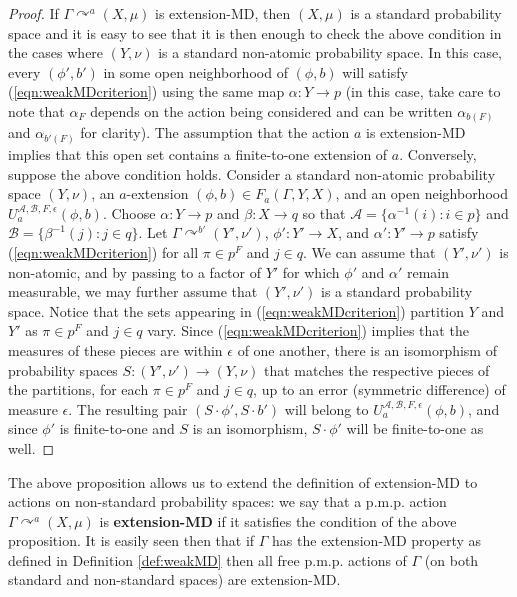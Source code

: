 \documentclass[12pt]{amsart}
\theoremstyle{definition}
\def\cal{\mathcal}
\newcommand{\pmp}{p{$.$}m{$.$}p{$.$}}
\newcommand{\acts}{\curvearrowright}
\begin{document}
\begin{proof}
    If $\Gamma \acts^a (X, \mu)$ is extension-MD, then $(X, \mu)$ is a standard probability space and it is easy to see that it is then enough to check the above condition in the cases where $(Y, \nu)$ is a standard non-atomic probability space. In this case, every $(\phi', b')$ in some open neighborhood of $(\phi, b)$ will satisfy (\ref{eqn:weakMDcriterion}) using the same map $\alpha : Y \to p$ (in this case, take care to note that $\alpha_F$ depends on the action being considered and can be written $\alpha_{b(F)}$ and $\alpha_{b'(F)}$ for clarity). The assumption that the action $a$ is extension-MD implies that this open set contains a finite-to-one extension of $a$. Conversely, suppose the above condition holds. Consider a standard non-atomic probability space $(Y, \nu)$, an $a$-extension $(\phi, b) \in F_a(\Gamma, Y, X)$, and an open neighborhood $U^{\cal A, \cal B, F, \epsilon}_a(\phi, b)$. Choose $\alpha : Y \to p$ and $\beta : X \to q$ so that $\cal A = \{\alpha^{-1}(i) : i \in p\}$ and $\cal B = \{\beta^{-1}(j) : j \in q\}$. Let $\Gamma \acts^{b'} (Y', \nu')$, $\phi' : Y' \rightarrow X$, and $\alpha' : Y' \to p$ satisfy (\ref{eqn:weakMDcriterion}) for all $\pi \in p^F$ and $j \in q$. We can assume that $(Y', \nu')$ is non-atomic, and by passing to a factor of $Y'$ for which $\phi'$ and $\alpha'$ remain measurable, we may further assume that $(Y', \nu')$ is a standard probability space. Notice that the sets appearing in (\ref{eqn:weakMDcriterion}) partition $Y$ and $Y'$ as $\pi \in p^F$ and $j \in q$ vary. Since (\ref{eqn:weakMDcriterion}) implies that the measures of these pieces are within $\epsilon$ of one another, there is an isomorphism of probability spaces $S : (Y', \nu') \rightarrow (Y, \nu)$ that matches the respective pieces of the partitions, for each $\pi \in p^F$ and $j \in q$, up to an error (symmetric difference) of measure $\epsilon$. The resulting pair $(S \cdot \phi', S \cdot b')$ will belong to $U^{\cal A, \cal B, F, \epsilon}_a(\phi, b)$, and since $\phi'$ is finite-to-one and $S$ is an isomorphism, $S \cdot \phi'$ will be finite-to-one as well.
\end{proof}

The above proposition allows us to extend the definition of extension-MD to actions on non-standard probability spaces: we say that a {\pmp} action $\Gamma \acts^a (X, \mu)$ is \textbf{extension-MD} if it satisfies the condition of the above proposition. It is easily seen then that if $\Gamma$ has the extension-MD property as defined in Definition \ref{def:weakMD} then all free {\pmp} actions of $\Gamma$ (on both standard and non-standard spaces) are extension-MD.
\end{document}
